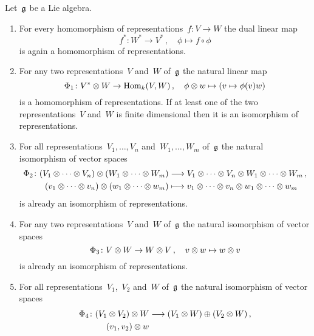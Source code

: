 \begin{proposition}
  \label{list of homomorphism of representations}
  Let~$\mathfrak{g}$ be a Lie algebra.
 \begin{enumerate}
    \item
      For every homomorphism of representations~$f \colon V \to W$ the dual linear map
      \[
        f^*
        \colon
        W^*
        \to
        V^* \,,
        \quad
        \phi
        \mapsto
        f \circ \phi
      \]
      is again a homomorphism of representations.
    \item
      For any two representations~$V$ and~$W$ of~$\mathfrak{g}$ the natural linear map
      \[
        \Phi_1
        \colon
        V^* \otimes W
        \to
        \operatorname{Hom}_k(V,W) \,,
        \quad
        \phi \otimes w
        \mapsto
        (v \mapsto \phi(v) w)
      \]
      is a homomorphism of representations.
      If at least one of the two representations~$V$ and~$W$ is finite dimensional then it is an isomorphism of representations.
    \item
      For all representations~$V_1, \dotsc, V_n$ and~$W_1, \dotsc, W_m$ of~$\mathfrak{g}$ the natural isomorphism of vector spaces
      \begin{align*}
        \Phi_2
        \colon
        (V_1 \otimes \dotsb \otimes V_n) \otimes (W_1 \otimes \dotsb \otimes W_m)
        &\longrightarrow
        V_1 \otimes \dotsb \otimes V_n \otimes W_1 \otimes \dotsb \otimes W_m \,,
        \\
        (v_1 \otimes \dotsb \otimes v_n) \otimes (w_1 \otimes \dotsb \otimes w_m)
        &\longmapsto
        v_1 \otimes \dotsb \otimes v_n \otimes w_1 \otimes \dotsb \otimes w_m
      \end{align*}
      is already an isomorphism of representations.
    \item
      For any two representations~$V$ and~$W$ of~$\mathfrak{g}$ the natural isomorphism of vector spaces
      \[
        \Phi_3
        \colon
        V \otimes W
        \to
        W \otimes V \,,
        \quad
        v \otimes w
        \mapsto
        w \otimes v
      \]
      is already an isomorphism of representations.
    \item
      For all representations~$V_1$,~$V_2$ and~$W$ of~$\mathfrak{g}$ the natural isomorphism of vector spaces
      \begin{align*}
        \Phi_4
        \colon
        (V_1 \tensor V_2) \tensor W
        &\longto
        (V_1 \tensor W) \oplus (V_2 \tensor W) \,,
        \\
        (v_1, v_2) \tensor w

\end{align*}
\end{enumerate}
\end{proposition}
